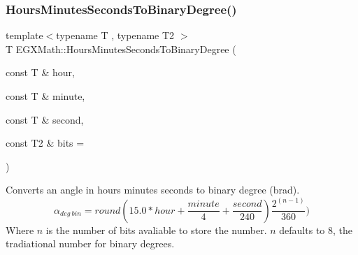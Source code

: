 \mbox{\label{group___e_g_x_math-_angle_conversions-_hours_minutes_seconds_ga962a367fd21f0047eb0a7116a59c2bfc}} 
\subsubsection{\texorpdfstring{Hours\+Minutes\+Seconds\+To\+Binary\+Degree()}{HoursMinutesSecondsToBinaryDegree()}}
{\footnotesize\ttfamily template$<$typename T , typename T2 $>$ \\
T E\+G\+X\+Math\+::\+Hours\+Minutes\+Seconds\+To\+Binary\+Degree (\begin{DoxyParamCaption}\item[{const T \&}]{hour,  }\item[{const T \&}]{minute,  }\item[{const T \&}]{second,  }\item[{const T2 \&}]{bits = {} }\end{DoxyParamCaption})}



Converts an angle in hours minutes seconds to binary degree (brad). \[\alpha_{deg\ bin}=round(15.0 * hour + \frac{minute}{4} + \frac{second}{240})\frac{2^{(n-1)}}{360})\] Where $n$ is the number of bits avaliable to store the number. $n$ defaults to 8, the tradiational number for binary degrees. 

